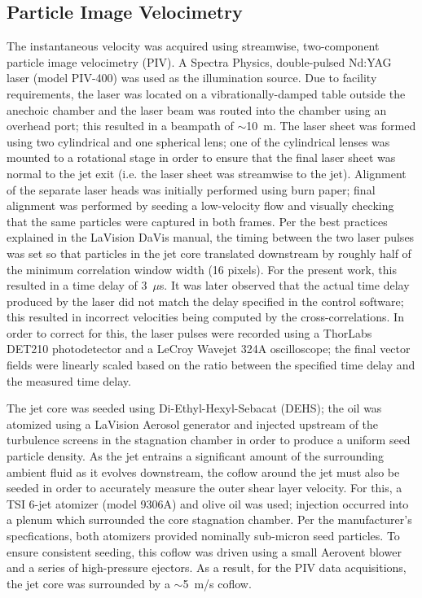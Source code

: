 \subsection{Particle Image Velocimetry}
\label{sect:piv_method}
The instantaneous velocity was acquired using streamwise, two-component particle image velocimetry (PIV). 
A Spectra Physics, double-pulsed Nd:YAG laser (model PIV-400) was used as the illumination source. 
Due to facility requirements, the laser was located on a vibrationally-damped table outside the anechoic chamber and the laser beam was routed into the chamber using an overhead port; this resulted in a beampath of $\sim$10~m. 
The laser sheet was formed using two cylindrical and one spherical lens; one of the cylindrical lenses was mounted to a rotational stage in order to ensure that the final laser sheet was normal to the jet exit (i.e. the laser sheet was streamwise to the jet).
Alignment of the separate laser heads was initially performed using burn paper; final alignment was performed by seeding a low-velocity flow and visually checking that the same particles were captured in both frames.
Per the best practices explained in the LaVision DaVis manual, the timing between the two laser pulses was set so that particles in the jet core translated downstream by roughly half of the minimum correlation window width (16 pixels).
For the present work, this resulted in a time delay of 3~$\mu$s.
It was later observed that the actual time delay produced by the laser did not match the delay specified in the control software; this resulted in incorrect velocities being computed by the cross-correlations.
In order to correct for this, the laser pulses were recorded using a ThorLabs DET210 photodetector and a LeCroy Wavejet 324A oscilloscope; the final vector fields were linearly scaled based on the ratio between the specified time delay and the measured time delay.

The jet core was seeded using Di-Ethyl-Hexyl-Sebacat (DEHS); the oil was atomized using a LaVision Aerosol generator and injected upstream of the turbulence screens in the stagnation chamber in order to produce a uniform seed particle density.
As the jet entrains a significant amount of the surrounding ambient fluid as it evolves downstream, the coflow around the jet must also be seeded in order to accurately measure the outer shear layer velocity.
For this, a TSI 6-jet atomizer (model 9306A) and olive oil was used; injection occurred into a plenum which surrounded the core stagnation chamber.
Per the manufacturer's specfications, both atomizers provided nominally sub-micron seed particles.
To ensure consistent seeding, this coflow was driven using a small Aerovent blower and a series of high-pressure ejectors. 
As a result, for the PIV data acquisitions, the jet core was surrounded by a $\sim$5~m/s coflow. 

